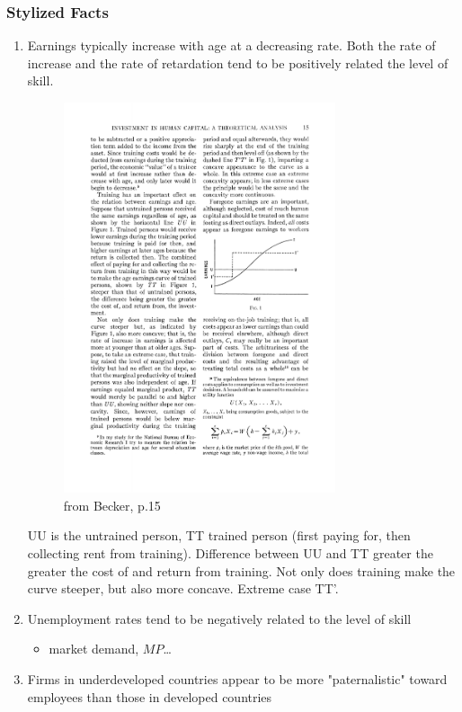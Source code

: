\documentclass[12pt,a4paper]{article}
\begin{document}
  \subsubsection{Stylized Facts} %
  \begin{enumerate}
    \item Earnings typically increase with age at a decreasing rate. Both the rate of increase and the rate of retardation tend to be positively related the level of skill.\\
      \begin{figure}[ht]
        \centering
        \includegraphics[width=8cm]{fig1.pdf}
        \caption{from Becker, p.15}
        \label{fig1}
      \end{figure}
      UU is the untrained person, TT trained person (first paying for, then collecting rent from training). Difference between UU and TT greater the greater the cost of and return from training. Not only does training make the curve steeper, but also more concave. Extreme case TT'.
    \item Unemployment rates tend to be negatively related to the level of skill
      \begin{itemize}
        \item market demand, $MP$\dots
      \end{itemize}
    \item Firms in underdeveloped countries appear to be more
      "paternalistic" toward employees than those in developed countries

\end{enumerate}
\end{document}

